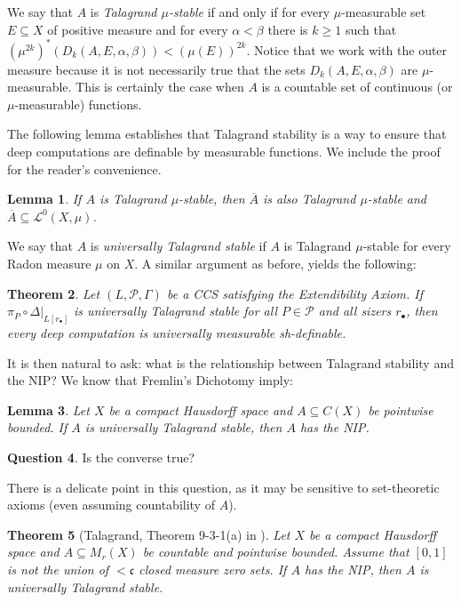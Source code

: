 \documentclass[psamsfonts]{amsart}
\newtheorem{thm}{Theorem}[section]
\newtheorem{lem}[thm]{Lemma}
\theoremstyle{definition}
\newtheorem{question}[thm]{Question}
\theoremstyle{remark}
\numberwithin{equation}{section}
\begin{document}
We say that $A$ is \emph{Talagrand $\mu$-stable} if and only if for every $\mu$-measurable set $E\subseteq X$ of positive measure and for every $\alpha<\beta$ there is $k\geq 1$ such that $(\mu^{2k})^*(D_k(A,E,\alpha,\beta))<(\mu(E))^{2k}$. Notice that we work with the outer measure because it is not necessarily true that the sets $D_k(A,E,\alpha,\beta)$ are $\mu$-measurable. This is certainly the case when $A$ is a countable set of continuous (or $\mu$-measurable) functions. 

The following lemma establishes that Talagrand stability is a way to ensure that deep computations are definable by measurable functions. We include the proof for the reader's convenience.

\begin{lem}
    If $A$ is Talagrand $\mu$-stable, then $\overline{A}$ is also Talagrand $\mu$-stable and $\overline{A}\subseteq\mathcal{L}^0(X,\mu)$.
\end{lem}

We say that $A$ is \emph{universally Talagrand stable} if $A$ is Talagrand $\mu$-stable for every Radon measure $\mu$ on $X$. A similar argument as before, yields the following:

\begin{thm}
    Let $(L,\mathcal P,\Gamma)$ be a CCS satisfying the Extendibility Axiom. If $\pi_P\circ\Delta|_{L[r_\bullet]}$ is universally Talagrand stable for all $P\in\mathcal{P}$ and all sizers $r_{\bullet}$, then every deep computation is universally measurable sh-definable.
\end{thm}

It is then natural to ask: what is the relationship between Talagrand stability and the NIP? We know that Fremlin's Dichotomy imply:

\begin{lem}
    Let $X$ be a compact Hausdorff space and $A\subseteq C(X)$ be pointwise bounded. If $A$ is universally Talagrand stable, then $A$ has the NIP.
\end{lem}

\begin{question}
    Is the converse true?
\end{question}

There is a delicate point in this question, as it may be sensitive to set-theoretic axioms (even assuming countability of $A$).

\begin{thm}[Talagrand, Theorem 9-3-1(a) in \cite{talagrand1984pettis}]
    Let $X$ be a compact Hausdorff space and $A\subseteq M_r(X)$ be countable and pointwise bounded. Assume that $[0,1]$ is not the union of $<\mathfrak{c}$ closed measure zero sets. If $A$ has the NIP, then $A$ is universally Talagrand stable.
\end{thm}
\end{document}
